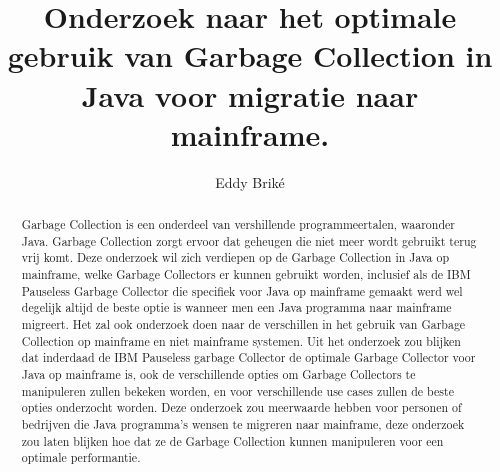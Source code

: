 \documentclass{hogent-article}
\title{Onderzoek naar het optimale gebruik van Garbage Collection in Java voor migratie naar mainframe.}
\author{Eddy Briké}
\begin{document}
\begin{abstract}
    
  Garbage Collection is een onderdeel van vershillende programmeertalen, waaronder Java.
  Garbage Collection zorgt ervoor dat geheugen die niet meer wordt gebruikt terug vrij komt.
  Deze onderzoek wil zich verdiepen op de Garbage Collection in Java op mainframe, welke Garbage Collectors er kunnen gebruikt worden, inclusief als de IBM Pauseless Garbage Collector die specifiek voor Java op mainframe gemaakt werd wel degelijk altijd de beste optie is wanneer men een Java programma naar mainframe migreert.
  Het zal ook onderzoek doen naar de verschillen in het gebruik van Garbage Collection op mainframe en niet mainframe systemen.
  Uit het onderzoek zou blijken dat inderdaad de IBM Pauseless garbage Collector de optimale Garbage Collector voor Java op mainframe is, ook de verschillende opties om Garbage Collectors te manipuleren zullen bekeken worden, en voor verschillende use cases zullen de beste opties onderzocht worden.
  Deze onderzoek zou meerwaarde hebben voor personen of bedrijven die Java programma's wensen te migreren naar mainframe, deze onderzoek zou laten blijken hoe dat ze de Garbage Collection kunnen manipuleren voor een optimale performantie.
    
  
  
  
  
  
  
\end{abstract}

\tableofcontents



\printbibliography[heading=bibintoc]
\end{document}
